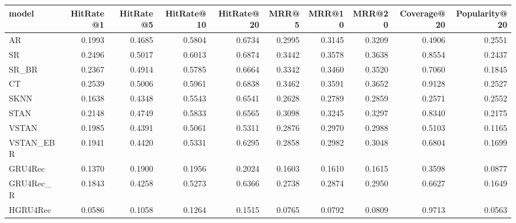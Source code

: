 \begin{tabular}{lrrrrrrrrr}
\toprule
     model &  HitRate@1 &  HitRate@5 &  HitRate@10 &  HitRate@20 &   MRR@5 &  MRR@10 &  MRR@20 &  Coverage@20 &  Popularity@20 \\
\midrule
        AR &     0.1993 &     0.4685 &      0.5804 &      0.6734 &  0.2995 &  0.3145 &  0.3209 &       0.4906 &         0.2551 \\
        SR &     0.2496 &     0.5017 &      0.6013 &      0.6874 &  0.3442 &  0.3578 &  0.3638 &       0.8554 &         0.2437 \\
     SR\_BR &     0.2367 &     0.4914 &      0.5785 &      0.6664 &  0.3342 &  0.3460 &  0.3520 &       0.7060 &         0.1845 \\
        CT &     0.2539 &     0.5006 &      0.5961 &      0.6838 &  0.3462 &  0.3591 &  0.3652 &       0.9128 &         0.2527 \\
      SKNN &     0.1638 &     0.4348 &      0.5543 &      0.6541 &  0.2628 &  0.2789 &  0.2859 &       0.2571 &         0.2552 \\
      STAN &     0.2148 &     0.4749 &      0.5833 &      0.6565 &  0.3098 &  0.3245 &  0.3297 &       0.8340 &         0.2175 \\
     VSTAN &     0.1985 &     0.4391 &      0.5061 &      0.5311 &  0.2876 &  0.2970 &  0.2988 &       0.5103 &         0.1165 \\
 VSTAN\_EBR &     0.1941 &     0.4420 &      0.5331 &      0.6295 &  0.2858 &  0.2982 &  0.3048 &       0.6804 &         0.1699 \\
   GRU4Rec &     0.1370 &     0.1900 &      0.1956 &      0.2024 &  0.1603 &  0.1610 &  0.1615 &       0.3598 &         0.0877 \\
 GRU4Rec\_R &     0.1843 &     0.4258 &      0.5273 &      0.6366 &  0.2738 &  0.2874 &  0.2950 &       0.6627 &         0.1649 \\
  HGRU4Rec &     0.0586 &     0.1058 &      0.1264 &      0.1515 &  0.0765 &  0.0792 &  0.0809 &       0.9713 &         0.0563 \\
\bottomrule
\end{tabular}
